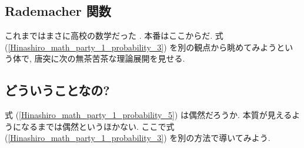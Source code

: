 \documentclass[openany, a4paper, oneside]{jsbook}
\begin{document}
\subsection{Rademacher 関数}

これまではまさに高校の数学だった \footnotemark[52]{}.
本番はここからだ.
式 (\ref{Hinashiro_math_party_1_probability_3}) を別の観点から眺めてみようという体で,
唐突に次の無茶苦茶な理論展開を見せる.
\subsection{どういうことなの?}

式 (\ref{Hinashiro_math_party_1_probability_5}) は偶然だろうか.
本質が見えるようになるまでは偶然というほかない.
ここで式 (\ref{Hinashiro_math_party_1_probability_3}) を別の方法で導いてみよう.
\end{document}
